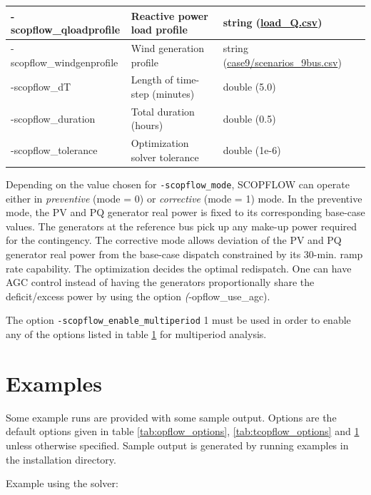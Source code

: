 \begin{table}[H]
\begin{tabular}{|p{}|p{}|p{}|p{}|}
    -scopflow\_qloadprofile & Reactive power load profile & string (\href{https://github.com/ORNL/ExaGO/tree/develop/datafiles/case9/load_Q.csv}{load\_Q.csv}) &\\ \hline
    -scopflow\_windgenprofile & Wind generation profile & string (\href{https://github.com/ORNL/ExaGO/tree/develop/datafiles/case9/scenarios_9bus.csv}{case9/scenarios\_9bus.csv}) &\\ \hline
    -scopflow\_dT & Length of time-step (minutes) & double (5.0) &\\ \hline
    -scopflow\_duration & Total duration (hours) & double (0.5) &\\ \hline 
    -scopflow\_tolerance & Optimization solver tolerance & double (1e-6) &\\ \hline 
  \end{tabular}
  \label{tab:scopflow_options}
\end{table}

Depending on the value chosen for \texttt{-scopflow_mode}, SCOPFLOW can operate
either in \emph{preventive} (mode = 0) or \emph{corrective} (mode = 1) mode. In
the preventive mode, the PV and PQ generator real power is fixed to its
corresponding base-case values. The generators at the reference bus pick up any
make-up power required for the contingency. The corrective mode allows deviation
of the PV and PQ generator real power from the base-case dispatch constrained by
its 30-min. ramp rate capability. The optimization decides the optimal
redispatch. One can have AGC control instead of having the generators proportionally share the deficit/excess power by using the option \emph(-opflow\_use\_agc).

The option \texttt{-scopflow_enable_multiperiod} 1 must be used in order to enable any of the options listed in table \ref{tab:scopflow_options} for multiperiod analysis.

\section{Examples}

Some \scopflow example runs are provided with some sample output. Options are the default options given in table \ref{tab:opflow_options}, \ref{tab:tcopflow_options} and \ref{tab:scopflow_options} unless otherwise specified. Sample output is generated by running examples in the installation directory.

Example using the \ipopt solver:

